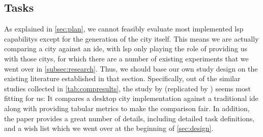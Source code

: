 \documentclass[../thesis]{subfiles}
\begin{document}
\subsection{Tasks}\label{subsec:tasks}
As explained in \cref{sec:plan}, we cannot feasibly evaluate most implemented \gls{lsp} \glspl{capability} except for the generation of the \gls{city} itself.
This means we are actually comparing a \gls{city} against an \gls{ide}, with \gls{lsp} only playing the role of providing us with those \glspl{city}, for which there are a number of existing experiments that we went over in \cref{subsec:research}.
Thus, we should base our own study design on the existing literature established in that section.
Specifically, out of the similar studies collected in \cref{tab:compresults}, the study by \textcites{wettel2011} (replicated by \textcite{romano2019}) seems most fitting for us:
It compares a desktop \gls{city} implementation against a traditional \gls{ide} along with providing tabular metrics to make the comparison fair.
In addition, the paper provides a great number of details, including detailed task definitions, and a wish list which we went over at the beginning of \cref{sec:design}.
\end{document}
